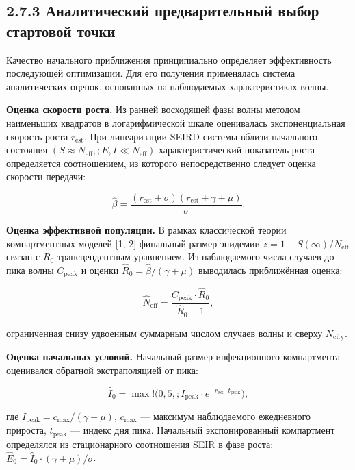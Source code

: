 \documentclass[12pt]{article}
\begin{document}
\subsection{2.7.3 Аналитический предварительный выбор стартовой
точки}\label{ux430ux43dux430ux43bux438ux442ux438ux447ux435ux441ux43aux438ux439-ux43fux440ux435ux434ux432ux430ux440ux438ux442ux435ux43bux44cux43dux44bux439-ux432ux44bux431ux43eux440-ux441ux442ux430ux440ux442ux43eux432ux43eux439-ux442ux43eux447ux43aux438}

Качество начального приближения принципиально определяет эффективность
последующей оптимизации. Для его получения применялась система
аналитических оценок, основанных на наблюдаемых характеристиках волны.

\textbf{Оценка скорости роста.} Из ранней восходящей фазы волны методом
наименьших квадратов в логарифмической шкале оценивалась
экспоненциальная скорость роста \(r_{\text{est}}\). При линеаризации
SEIRD-системы вблизи начального состояния
\((S \approx N_{\text{eff}},; E, I \ll N_{\text{eff}})\)
характеристический показатель роста определяется соотношением, из
которого непосредственно следует оценка скорости передачи:

\[\hat{\beta} = \frac{(r_{\text{est}} + \sigma)(r_{\text{est}} + \gamma + \mu)}{\sigma}.\]

\textbf{Оценка эффективной популяции.} В рамках классической теории
компартментных моделей {[}1, 2{]} финальный размер эпидемии
\(z = 1 - S(\infty)/N_{\text{eff}}\) связан с \(R_0\) трансцендентным
уравнением. Из наблюдаемого числа случаев до пика волны
\(C_{\text{peak}}\) и оценки \(\hat{R}_0 = \hat{\beta}/(\gamma + \mu)\)
выводилась приближённая оценка:

\[\hat{N}_{\text{eff}} = \frac{C_{\text{peak}} \cdot \hat{R}_0}{\hat{R}_0 - 1},\]

ограниченная снизу удвоенным суммарным числом случаев волны и сверху
\(N_{\text{city}}\).

\textbf{Оценка начальных условий.} Начальный размер инфекционного
компартмента оценивался обратной экстраполяцией от пика:

\[\hat{I}_0 = \max!\bigl(0{,}5,; I_{\text{peak}} \cdot e^{-r_{\text{est}} \cdot t_{\text{peak}}}\bigr),\]

где \(I_{\text{peak}} = c_{\text{max}} / (\gamma + \mu)\),
\(c_{\text{max}}\) --- максимум наблюдаемого ежедневного прироста,
\(t_{\text{peak}}\) --- индекс дня пика. Начальный экспонированный
компартмент определялся из стационарного соотношения SEIR в фазе роста:
\(\hat{E}_0 = \hat{I}_0 \cdot (\gamma + \mu) / \sigma\).
\end{document}

